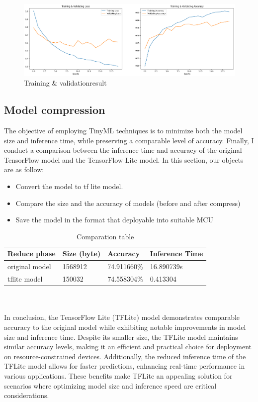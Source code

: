 \begin{center}
    \begin{figure}[!htp]
        \centering
        \includegraphics[width=0.8 \textwidth]{image/training_validating.png}
        \caption{Training \& validationresult}
        \label{subsection}
    \end{figure}
    \end{center}

\subsection{Model compression}
The objective of employing TinyML techniques is to minimize both the model size and inference time, while preserving a comparable level of accuracy.
Finally, I conduct a comparison between the inference time and accuracy of the original TensorFlow model and the TensorFlow Lite model. In this section, our objects are as follow:

\begin{itemize}
    \item Convert the model to tf lite model.
    \item Compare the size and the accuracy of models (before and after compress)
    \item Save the model in the format that deployable into suitable MCU
\end{itemize}

    \begin{table}[H]
        \centering
        \begin{tabular}{|l|l|l|l|}
            \hline
            \textbf{Reduce phase} & Size (byte) & Accuracy & Inference Time  \\ \hline
             original model & 1568912 & 74.911660\% & 16.890739s \\
             tflite model & 150032 & 74.558304\% & 0.413304 \\ \hline
        \end{tabular}
        \caption{Comparation table}
        \label{tab:my_label}
    \end{table}

\\
\\
In conclusion, the TensorFlow Lite (TFLite) model demonstrates comparable accuracy to the original model while exhibiting notable improvements in model size and inference time. Despite its smaller size, the TFLite model maintains similar accuracy levels, making it an efficient and practical choice for deployment on resource-constrained devices. Additionally, the reduced inference time of the TFLite model allows for faster predictions, enhancing real-time performance in various applications. 
These benefits make TFLite an appealing solution for scenarios where optimizing model size and inference speed are critical considerations.